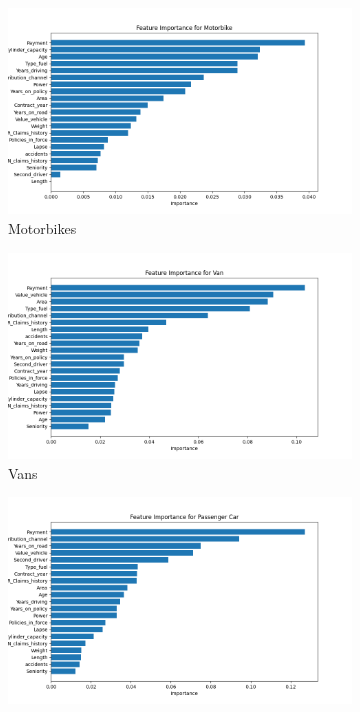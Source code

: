 \documentclass{llncs}
\begin{document}
\begin{figure}
    \centering
     \begin{subfigure}{0.45\linewidth}
      \includegraphics[width=\linewidth]{images/Motorbike_feature_importance_xgb.png}
      \caption{Motorbikes}
      \label{fig:subxgb1}
     \end{subfigure}
     \begin{subfigure}{0.45\linewidth}
      \includegraphics[width=\linewidth]{images/Van_feature_importance_xgb.png}
      \caption{Vans}
      \label{fig:subxgb2}
      \end{subfigure}
  \vfill
       \begin{subfigure}{0.45\linewidth}
       \includegraphics[width=\linewidth]{images/Passenger Car_feature_importance_xgb.png}

\end{subfigure}
\end{figure}
\end{document}
